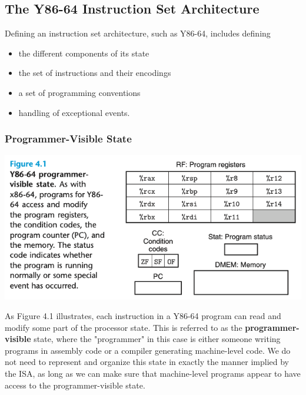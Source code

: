 \documentclass[11pt]{article}
\begin{document}
\subsection{The Y86-64 Instruction Set Architecture}
\label{sec:org28715d7}
Defining an instruction set architecture, such as Y86-64, includes defining\\
\begin{itemize}
\item the different components of its state\\
\item the set of instructions and their encodings\\
\item a set of programming conventions\\
\item handling of exceptional events.\\
\end{itemize}

\subsubsection{Programmer-Visible State}
\label{sec:orgd25d4f0}

\begin{center}
\includegraphics[width=.9\linewidth]{pics/y86-64-programmer-visible-state.png}
\end{center}

As Figure 4.1 illustrates, each instruction in a Y86-64 program can read and modify some part of the processor state. This is referred to as the \textbf{programmer-visible} state, where the "programmer" in this case is either someone writing programs in assembly code or a compiler generating machine-level code. We do not need to represent and organize this state in exactly the manner implied by the ISA, as long as we can make sure that machine-level programs appear to have access to the programmer-visible state.\\
\end{document}
